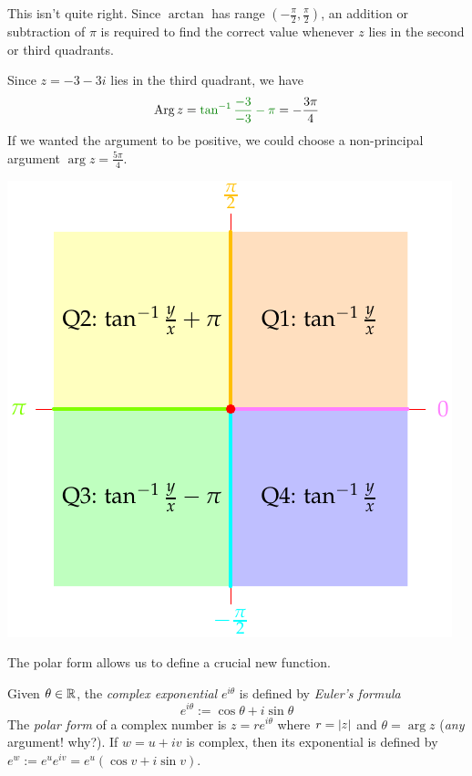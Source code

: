 \begin{minipage}[t]{0.55\linewidth}\vspace{0pt}
	This isn't quite right. Since $\arctan$ has range $(-\frac\pi 2,\frac\pi 2)$, an addition or subtraction of $\pi$ is required to find the correct value whenever $z$ lies in the second or third quadrants.
	
	\begin{example}{}{}
		Since $z=-3-3i$ lies in the third quadrant, we have
		\[
			\Arg z=\textcolor{Green}{\tan^{-1}\frac{-3}{-3}-\pi}=-\frac{3\pi}4
		\]
		If we wanted the argument to be positive, we could choose a non-principal argument $\arg z=\frac{5\pi}4$.
	\end{example}
\end{minipage}
\hfill
\begin{minipage}[t]{0.44\linewidth}\vspace{-50pt}
	\flushright\includegraphics[scale=0.9]{intro-argument}
\end{minipage}
\bigbreak

The polar form allows us to define a crucial new function.

\begin{defn}{}{}
	Given $\theta\in\mathbb{R}$, the \emph{complex exponential} $e^{i\theta}$ is defined by \emph{Euler's formula}
	\[
		e^{i\theta}:=\cos\theta+i\sin\theta
	\]
	The \emph{polar form} of a complex number is $z=re^{i\theta}$ where $r=\left| z\right|$ and $\theta=\arg z$ (\emph{any} argument! why?).\smallbreak
	If $w=u+iv$ is complex, then its exponential is defined by $e^w:=e^ue^{iv}=e^u(\cos v+i\sin v)$.
\end{defn}
\goodbreak



